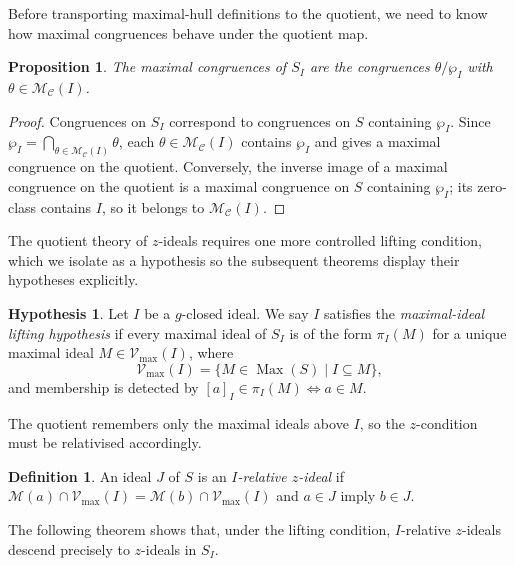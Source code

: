 \documentclass[11pt,leqno]{amsart}
\theoremstyle{plain}
\newtheorem{proposition}[theorem]{Proposition}
\theoremstyle{definition}
\newtheorem{definition}{Definition}[section]
\newtheorem{hypothesis}[theorem]{Hypothesis}
\theoremstyle{remark}
\numberwithin{equation}{section}
\DeclareMathOperator{\Max}{Max}
\newcommand{\M}{\mathcal M}
\newcommand{\MC}{\mathcal M_{\mathcal C}}
\begin{document}
Before transporting maximal-hull definitions to the quotient,
we need to know how maximal congruences behave under the quotient map.

\begin{proposition}\label{prop:quotient-congruence-max}
The maximal congruences of $S_I$ are the congruences
$\theta/\wp_I$ with $\theta\in\MC(I)$.
\end{proposition}
\begin{proof}
Congruences on $S_I$ correspond to congruences on $S$ containing
$\wp_I$.
Since $\wp_I=\bigcap_{\theta\in\MC(I)}\theta$, each $\theta\in\MC(I)$
contains $\wp_I$ and gives a maximal congruence on the quotient.
Conversely, the inverse image of a maximal congruence on the quotient
is a maximal congruence on $S$ containing $\wp_I$;
its zero-class contains $I$, so it belongs to $\MC(I)$.
\end{proof}

The quotient theory of $z$-ideals requires one more controlled
lifting condition, which we isolate as a hypothesis so the subsequent
theorems display their hypotheses explicitly.

\begin{hypothesis}\label{hyp:quotient-lifting}
Let $I$ be a $g$-closed ideal.
We say $I$ satisfies the \emph{maximal-ideal lifting hypothesis}
if every maximal ideal of $S_I$ is of the form $\pi_I(M)$ for a
unique maximal ideal $M\in\mathcal{V}_{\max}(I)$, where
\[
\mathcal{V}_{\max}(I)=\{M\in\Max(S)\mid I\subseteq M\},
\]
and membership is detected by
$[a]_I\in\pi_I(M)\Leftrightarrow a\in M$.
\end{hypothesis}

The quotient remembers only the maximal ideals above $I$,
so the $z$-condition must be relativised accordingly.

\begin{definition}\label{def:I-relative}
An ideal $J$ of $S$ is an \emph{$I$-relative $z$-ideal} if
$\M(a)\cap\mathcal{V}_{\max}(I)=\M(b)\cap\mathcal{V}_{\max}(I)$
and $a\in J$ imply $b\in J$.
\end{definition}

The following theorem shows that, under the lifting condition,
$I$-relative $z$-ideals descend precisely to $z$-ideals in $S_I$.
\end{document}
